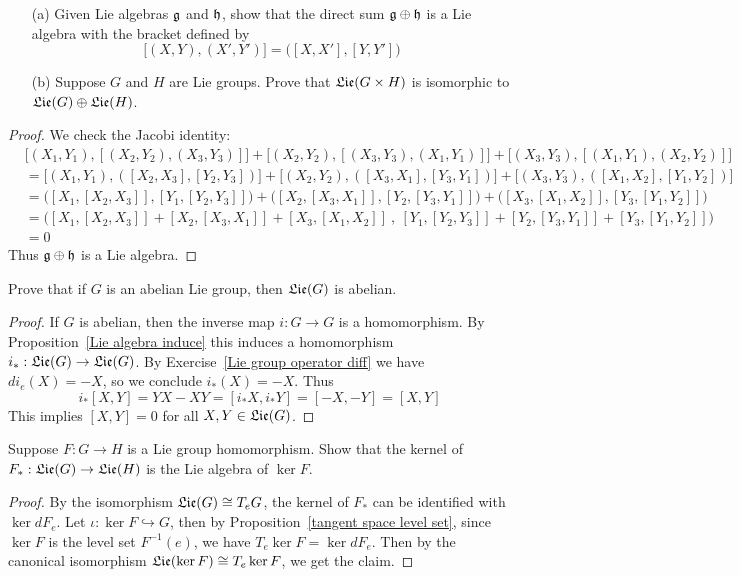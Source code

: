\begin{exercise}
\mbox{}
\begin{itemize}
\item[(a)]Given Lie algebras $\mathfrak{g}$ and $\mathfrak{h}$, show that the direct sum $\mathfrak{g}\oplus\mathfrak{h}$ is a Lie algebra with the bracket defined by
\[\big[(X,Y),(X',Y')\big]=\big([X,X'],[Y,Y']\big)\]
\item[(b)]Suppose $G$ and $H$ are Lie groups. Prove that $\mathfrak{Lie}(G\times H)$ is isomorphic to $\mathfrak{Lie}(G)\oplus\mathfrak{Lie}(H)$.
\end{itemize}
\end{exercise}
\begin{proof}
We check the Jacobi identity:
\begin{align*}
&\big[(X_1,Y_1),[(X_2,Y_2),(X_3,Y_3)]\big]+\big[(X_2,Y_2),[(X_3,Y_3),(X_1,Y_1)]\big]+\big[(X_3,Y_3),[(X_1,Y_1),(X_2,Y_2)]\big]\\
&=\big[(X_1,Y_1),([X_2,X_3],[Y_2,Y_3])\big]+\big[(X_2,Y_2),([X_3,X_1],[Y_3,Y_1])\big]+\big[(X_3,Y_3),([X_1,X_2],[Y_1,Y_2])\big]\\
&=\big([X_1,[X_2,X_3]],[Y_1,[Y_2,Y_3]]\big)+\big([X_2,[X_3,X_1]],[Y_2,[Y_3,Y_1]]\big)+\big([X_3,[X_1,X_2]],[Y_3,[Y_1,Y_2]]\big)\\
&=\big([X_1,[X_2,X_3]]+[X_2,[X_3,X_1]]+[X_3,[X_1,X_2]]\ ,\ [Y_1,[Y_2,Y_3]]+[Y_2,[Y_3,Y_1]]+[Y_3,[Y_1,Y_2]]\big)\\
&=0
\end{align*}
Thus $\mathfrak{g}\oplus\mathfrak{h}$ is a Lie algebra.\par
\end{proof}
\begin{exercise}
Prove that if $G$ is an abelian Lie group, then $\mathfrak{Lie}(G)$ is abelian.
\end{exercise}
\begin{proof}
If $G$ is abelian, then the inverse map $i:G\to G$ is a homomorphism. By Proposition~\ref{Lie algebra induce} this induces a homomorphism $i_*:\mathfrak{Lie}(G)\to\mathfrak{Lie}(G)$. By Exercise~\ref{Lie group operator diff} we have $di_e(X)=-X$, so we conclude $i_*(X)=-X$. Thus
\[i_*[X,Y]=YX-XY=[i_*X,i_*Y]=[-X,-Y]=[X,Y]\]
This implies $[X,Y]=0$ for all $X,Y\in\mathfrak{Lie}(G)$.
\end{proof}
\begin{exercise}
Suppose $F:G\to H$ is a Lie group homomorphism. Show that the kernel of $F_*:\mathfrak{Lie}(G)\to\mathfrak{Lie}(H)$ is the Lie algebra of $\ker F$.
\end{exercise}
\begin{proof}
By the isomorphism $\mathfrak{Lie}(G)\cong T_eG$, the kernel of $F_*$ can be identified with $\ker dF_e$. Let $\iota:\ker F\hookrightarrow G$, then by Proposition~\ref{tangent space level set}, since $\ker F$ is the level set $F^{-1}(e)$, we have $T_e\ker F=\ker dF_e$. Then by the canonical isomorphism $\mathfrak{Lie}(\ker F)\cong T_e\ker F$, we get the claim.
\end{proof}
